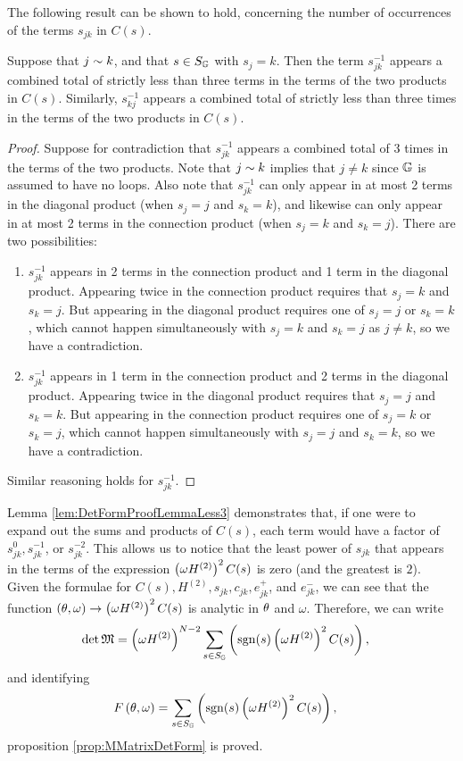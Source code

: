 The following result can be shown to hold, concerning the number of occurrences of the terms $s_{jk}$ in $C(s)$.
\begin{lemma} \label{lem:DetFormProofLemmaLess3}
	Suppose that $j\sim k$, and that $s\in S_{\mathbb{G}}$ with $s_j = k$.
	Then the term $s_{jk}^{-1}$ appears a combined total of strictly less than three terms in the terms of the two products in $C(s)$.
	Similarly, $s_{kj}^{-1}$ appears a combined total of strictly less than three times in the terms of the two products in $C(s)$.
\end{lemma}
\begin{proof}
	Suppose for contradiction that $s_{jk}^{-1}$ appears a combined total of 3 times in the terms of the two products.
	Note that $j\sim k$ implies that $j\neq k$ since $\mathbb{G}$ is assumed to have no loops.
	Also note that $s_{jk}^{-1}$ can only appear in at most 2 terms in the diagonal product (when $s_j=j$ and  $s_k=k$), and likewise can only appear in at most 2 terms in the connection product (when $s_j=k$ and $s_k=j$).
	There are two possibilities:
	\begin{enumerate}
		\item $s_{jk}^{-1}$ appears in 2 terms in the connection product and 1 term in the diagonal product.
		Appearing twice in the connection product requires that $s_j=k$ and $s_k=j$.
		But appearing in the diagonal product requires one of $s_j=j$ or $s_k=k$, which cannot happen simultaneously with $s_j=k$ and $s_k=j$ as $j\neq k$, so we have a contradiction.
		\item $s_{jk}^{-1}$ appears in 1 term in the connection product and 2 terms in the diagonal product.
		Appearing twice in the diagonal product requires that $s_j=j$ and $s_k=k$.
		But appearing in the connection product requires one of $s_j=k$ or $s_k=j$, which cannot happen simultaneously with $s_j=j$ and $s_k=k$, so we have a contradiction.
	\end{enumerate}
	Similar reasoning holds for $s_{jk}^{-1}$.
\end{proof}
Lemma \ref{lem:DetFormProofLemmaLess3} demonstrates that, if one were to expand out the sums and products of $C(s)$, each term would have a factor of $s_{jk}^{0}, s_{jk}^{-1}$, or $s_{jk}^{-2}$.
This allows us to notice that the least power of $s_{jk}$ that appears in the terms of the expression $\left(  \omega H^{(2)}  \right)^2 C(s)$ is zero (and the greatest is $2$).
Given the formulae for $C(s), H^{(2)}, s_{jk}, c_{jk}, e_{jk}^+$, and $e_{jk}^-$, we can see that the function $\left( \theta, \omega \right)\rightarrow\left(  \omega H^{(2)}  \right)^2 C(s)$ is analytic in $\theta$ and $\omega$.
Therefore, we can write
\begin{align*}
	\det\mathfrak{M} &= \left(  \omega H^{(2)}  \right)^{N-2} \sum_{s\in S_{\mathbb{G}}} \left(  \mathrm{sgn}(s) \left(  \omega H^{(2)}  \right)^2 C(s)  \right),
\end{align*}
and identifying
\begin{align*}
	F\left( \theta, \omega \right) &= \sum_{s\in S_{\mathbb{G}}} \left(  \mathrm{sgn}(s) \left(  \omega H^{(2)}  \right)^2 C(s)  \right),
\end{align*}
proposition \ref{prop:MMatrixDetForm} is proved.